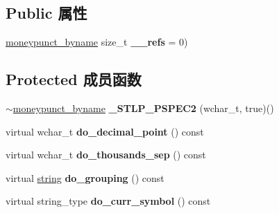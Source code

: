 \subsection*{Public 属性}
\begin{DoxyCompactItemize}
\item 
\mbox{\label{classmoneypunct__byname_3_01wchar__t_00_01true_01_4_a42a9355a742085e49968fdc7b51cd7cb}} 
\hyperlink{classmoneypunct__byname}{moneypunct\+\_\+byname} size\+\_\+t {\bfseries \+\_\+\+\_\+refs} = 0)
\end{DoxyCompactItemize}
\subsection*{Protected 成员函数}
\begin{DoxyCompactItemize}
\item 
\mbox{\label{classmoneypunct__byname_3_01wchar__t_00_01true_01_4_ae54bc77737cf6a6a4921583fe04f7f40}} 
$\sim$\hyperlink{classmoneypunct__byname}{moneypunct\+\_\+byname} {\bfseries \+\_\+\+S\+T\+L\+P\+\_\+\+P\+S\+P\+E\+C2} (wchar\+\_\+t, true)()
\item 
\mbox{\label{classmoneypunct__byname_3_01wchar__t_00_01true_01_4_adc5300cf05ea39de0d4a33edc3b6be8f}} 
virtual wchar\+\_\+t {\bfseries do\+\_\+decimal\+\_\+point} () const
\item 
\mbox{\label{classmoneypunct__byname_3_01wchar__t_00_01true_01_4_a6e1ff8af4a523b79917f1b330c1723e7}} 
virtual wchar\+\_\+t {\bfseries do\+\_\+thousands\+\_\+sep} () const
\item 
\mbox{\label{classmoneypunct__byname_3_01wchar__t_00_01true_01_4_af01a93008320b8e05c1900c7a815a647}} 
virtual \hyperlink{structstring}{string} {\bfseries do\+\_\+grouping} () const
\item 
\mbox{\label{classmoneypunct__byname_3_01wchar__t_00_01true_01_4_a25edeedd6ee04182ddd1348ef3e9d2a0}} 
virtual string\+\_\+type {\bfseries do\+\_\+curr\+\_\+symbol} () const

\end{DoxyCompactItemize}
